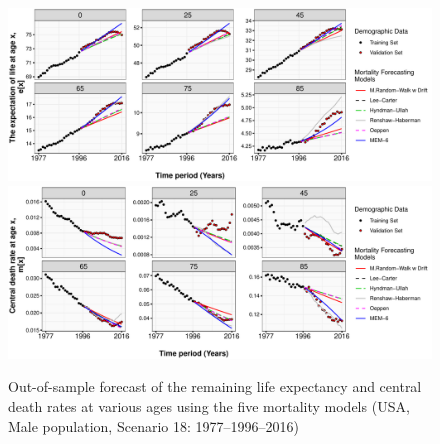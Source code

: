 \documentclass[T0_MEM]{subfiles}
\begin{document}
\begin{figure}[!hb]
  \includegraphics[width=1\linewidth]{figure/Figure_USA_ex}
  \includegraphics[width=1\linewidth]{figure/Figure_USA_mx}
  \caption{Out-of-sample forecast of the remaining life expectancy and central death rates at various ages using the five mortality models (USA, Male population, Scenario 18: 1977--1996--2016)}
\end{figure}

\newpage
\end{document}
